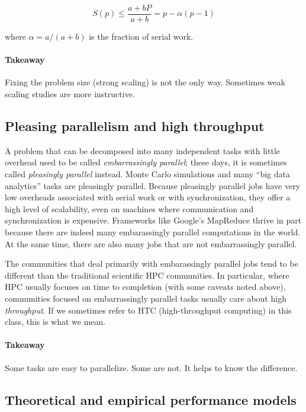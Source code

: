 \documentclass[12pt, leqno]{article} %
\begin{document}
\[
  S(p) \leq \frac{a + bP}{a + b} = p-\alpha(p-1)
\]

where $\alpha = a/(a+b)$ is the fraction of serial work.

\paragraph{Takeaway}

Fixing the problem size (strong scaling) is not the only way. Sometimes
weak scaling studies are more instructive.

\subsection{Pleasing parallelism and high throughput}

A problem that can be decomposed into many independent tasks with little
overhead used to be called \emph{embarrassingly parallel}; these days,
it is sometimes called \emph{pleasingly parallel} instead. Monte Carlo
simulations and many ``big data analytics'' tasks are pleasingly
parallel. Because pleasingly parallel jobs have very low overheads
associated with serial work or with synchronization, they offer a high
level of scalability, even on machines where communication and
synchronization is expensive. Frameworks like Google's MapReduce thrive
in part because there are indeed many embarassingly parallel
computations in the world. At the same time, there are also many jobs
that are not embarrassingly parallel.

The communities that deal primarily with embarassingly parallel jobs
tend to be different than the traditional scientific HPC communities. In
particular, where HPC usually focuses on time to completion (with some
caveats noted above), communities focused on embarrassingly parallel
tasks usually care about high \emph{throughput}. If we sometimes refer
to HTC (high-throughput computing) in this class, this is what we mean.

\paragraph{Takeaway}

Some tasks are easy to parallelize. Some are not. It helps to know the
difference.

\subsection{Theoretical and empirical performance models}
\end{document}
